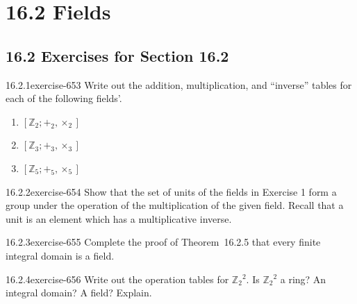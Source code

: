 \documentclass[twoside,10pt,]{book}
\numberwithin{equation}{section}
\begin{document}
\section*{16.2 Fields}
\subsection*{16.2 Exercises for Section 16.2}
\begin{divisionsolution}{16.2.1}{}{exercise-653}%
\hypertarget{p-5886}{}%
Write out the addition, multiplication, and ``inverse'' tables for each of the following fields'.\leavevmode%
\begin{enumerate}[label=(\alph*)]
\item\hypertarget{li-2599}{}\hypertarget{p-5887}{}%
\(\left[\mathbb{Z}_2; +_2, \times _2\right]\)%
\item\hypertarget{li-2600}{}\hypertarget{p-5888}{}%
\(\left[\mathbb{Z}_3; +_3, \times _3\right]\)%
\item\hypertarget{li-2601}{}\hypertarget{p-5889}{}%
\(\left[\mathbb{Z}_5; +_5, \times _5\right]\)%
\end{enumerate}
%
\end{divisionsolution}%
\begin{divisionsolution}{16.2.2}{}{exercise-654}%
\hypertarget{p-5890}{}%
Show that the set of units of the fields in Exercise 1 form a group under the operation of the multiplication of the given field. Recall that a unit is an element which has a multiplicative inverse.%
\end{divisionsolution}%
\begin{divisionsolution}{16.2.3}{}{exercise-655}%
\hypertarget{p-5891}{}%
Complete the proof of Theorem~16.2.5 that every finite integral domain is a field.%
\end{divisionsolution}%
\begin{divisionsolution}{16.2.4}{}{exercise-656}%
\hypertarget{p-5892}{}%
Write out the operation tables for \(\mathbb{Z}_2{}^2\).   Is \(\mathbb{Z}_2{}^2\) a ring? An integral domain? A field? Explain.%
\end{divisionsolution}%
\end{document}
